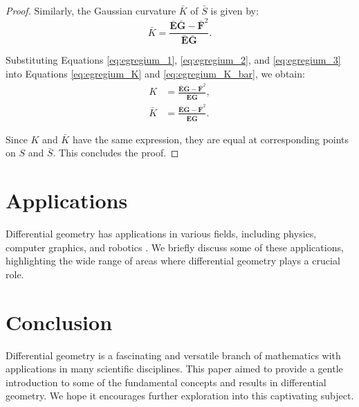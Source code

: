 \documentclass{article}
\theoremstyle{definition}
\numberwithin{equation}{section}
\begin{document}
\begin{proof}
Similarly, the Gaussian curvature $\bar{K}$ of $\bar{S}$ is given by:
\begin{equation}\label{eq:egregium_K_bar}
\bar{K} = \frac{\bar{\mathbf{E}}\bar{\mathbf{G}} - \bar{\mathbf{F}}^2}{\bar{\mathbf{E}}\bar{\mathbf{G}}}.
\end{equation}

Substituting Equations \eqref{eq:egregium_1}, \eqref{eq:egregium_2}, and \eqref{eq:egregium_3} into Equations \eqref{eq:egregium_K} and \eqref{eq:egregium_K_bar}, we obtain:
\begin{align*}
K &= \frac{\bar{\mathbf{E}}\bar{\mathbf{G}} - \bar{\mathbf{F}}^2}{\bar{\mathbf{E}}\bar{\mathbf{G}}}, \\
\bar{K} &= \frac{\bar{\mathbf{E}}\bar{\mathbf{G}} - \bar{\mathbf{F}}^2}{\bar{\mathbf{E}}\bar{\mathbf{G}}}.
\end{align*}

Since $K$ and $\bar{K}$ have the same expression, they are equal at corresponding points on $S$ and $\bar{S}$. This concludes the proof.
\end{proof}

\section{Applications}
Differential geometry has applications in various fields, including physics, computer graphics, and robotics \cite{do-carmo, pressley}. We briefly discuss some of these applications, highlighting the wide range of areas where differential geometry plays a crucial role.

\section{Conclusion}
Differential geometry is a fascinating and versatile branch of mathematics with applications in many scientific disciplines. This paper aimed to provide a gentle introduction to some of the fundamental concepts and results in differential geometry. We hope it encourages further exploration into this captivating subject.



\end{document}
